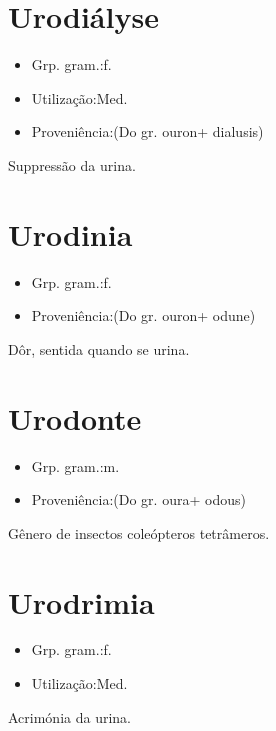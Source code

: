 \documentclass{article}
\begin{document}
\section{Urodiályse}
\begin{itemize}
\item {Grp. gram.:f.}
\end{itemize}
\begin{itemize}
\item {Utilização:Med.}
\end{itemize}
\begin{itemize}
\item {Proveniência:(Do gr. \textunderscore ouron\textunderscore  + \textunderscore dialusis\textunderscore )}
\end{itemize}
Suppressão da urina.
\section{Urodinia}
\begin{itemize}
\item {Grp. gram.:f.}
\end{itemize}
\begin{itemize}
\item {Proveniência:(Do gr. \textunderscore ouron\textunderscore  + \textunderscore odune\textunderscore )}
\end{itemize}
Dôr, sentida quando se urina.
\section{Urodonte}
\begin{itemize}
\item {Grp. gram.:m.}
\end{itemize}
\begin{itemize}
\item {Proveniência:(Do gr. \textunderscore oura\textunderscore  + \textunderscore odous\textunderscore )}
\end{itemize}
Gênero de insectos coleópteros tetrâmeros.
\section{Urodrimia}
\begin{itemize}
\item {Grp. gram.:f.}
\end{itemize}
\begin{itemize}
\item {Utilização:Med.}
\end{itemize}
Acrimónia da urina.
\end{document}
